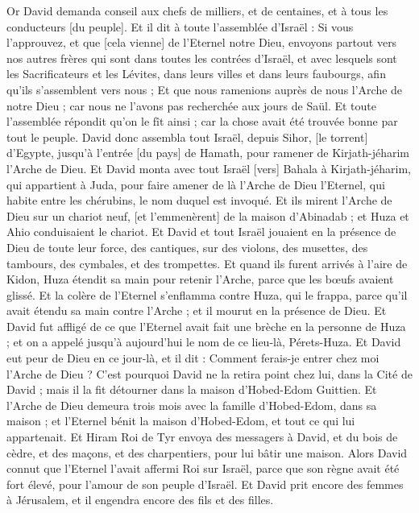 \begin{multicols}{2}
\VerseOne{}Or David demanda conseil aux chefs de milliers, et de centaines, et à tous les conducteurs [du peuple].
Et il dit à toute l'assemblée d'Israël : Si vous l'approuvez, et que [cela vienne] de l'Eternel notre Dieu, envoyons partout vers nos autres frères qui sont dans toutes les contrées d'Israël, et avec lesquels sont les Sacrificateurs et les Lévites, dans leurs villes et dans leurs faubourgs, afin qu'ils s'assemblent vers nous ;
Et que nous ramenions auprès de nous l'Arche de notre Dieu ; car nous ne l'avons pas recherchée aux jours de Saül.
Et toute l'assemblée répondit qu'on le fît ainsi ; car la chose avait été trouvée bonne par tout le peuple.
David donc assembla tout Israël, depuis Sihor, [le torrent] d'Egypte, jusqu'à l'entrée [du pays] de Hamath, pour ramener de Kirjath-jéharim l'Arche de Dieu.
Et David monta avec tout Israël [vers] Bahala à Kirjath-jéharim, qui appartient à Juda, pour faire amener de là l'Arche de Dieu l'Eternel, qui habite entre les chérubins, le nom duquel est invoqué.
Et ils mirent l'Arche de Dieu sur un chariot neuf, [et l'emmenèrent] de la maison d'Abinadab ; et Huza et Ahio conduisaient le chariot.
Et David et tout Israël jouaient en la présence de Dieu de toute leur force, des cantiques, sur des violons, des musettes, des tambours, des cymbales, et des trompettes.
Et quand ils furent arrivés à l'aire de Kidon, Huza étendit sa main pour retenir l'Arche, parce que les bœufs avaient glissé.
Et la colère de l'Eternel s'enflamma contre Huza, qui le frappa, parce qu'il avait étendu sa main contre l'Arche ; et il mourut en la présence de Dieu.
Et David fut affligé de ce que l'Eternel avait fait une brèche en la personne de Huza ; et on a appelé jusqu'à aujourd'hui le nom de ce lieu-là, Pérets-Huza.
Et David eut peur de Dieu en ce jour-là, et il dit : Comment ferais-je entrer chez moi l'Arche de Dieu ?
C'est pourquoi David ne la retira point chez lui, dans la Cité de David ; mais il la fit détourner dans la maison d'Hobed-Edom Guittien.
Et l'Arche de Dieu demeura trois mois avec la famille d'Hobed-Edom, dans sa maison ; et l'Eternel bénit la maison d'Hobed-Edom, et tout ce qui lui appartenait.
\VerseOne{}Et Hiram Roi de Tyr envoya des messagers à David, et du bois de cèdre, et des maçons, et des charpentiers, pour lui bâtir une maison.
Alors David connut que l'Eternel l'avait affermi Roi sur Israël, parce que son règne avait été fort élevé, pour l'amour de son peuple d'Israël.
Et David prit encore des femmes à Jérusalem, et il engendra encore des fils et des filles.

\end{multicols}
